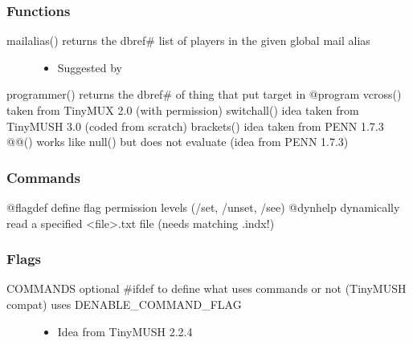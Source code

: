 \documentclass[letterpaper,10pt,english]{sphinxmanual}
\begin{document}
\subsubsection{Functions}
\label{\detokenize{changelog:id61}}\begin{description}
\item[{mailalias() \sphinxhyphen{} returns the dbref\# list of players in the given global mail alias}] \leavevmode\begin{itemize}
\item {} 
\sphinxAtStartPar
Suggested by 

\end{itemize}

\end{description}

\sphinxAtStartPar
programmer() \sphinxhyphen{} returns the dbref\# of thing that put target in @program
vcross() \sphinxhyphen{} taken from TinyMUX 2.0 (with permission)
switchall() \sphinxhyphen{} idea taken from TinyMUSH 3.0 (coded from scratch)
brackets() \sphinxhyphen{} idea taken from PENN 1.7.3
@@() \sphinxhyphen{} works like null() but does not evaluate (idea from PENN 1.7.3)


\subsubsection{Commands}
\label{\detokenize{changelog:id62}}
\sphinxAtStartPar
@flagdef \sphinxhyphen{} define flag permission levels (/set, /unset, /see)
@dynhelp \sphinxhyphen{} dynamically read a specified \textless{}file\textgreater{}.txt file (needs matching .indx!)


\subsubsection{Flags}
\label{\detokenize{changelog:id63}}\begin{description}
\item[{COMMANDS \sphinxhyphen{} optional \#ifdef to define what uses commands or not (TinyMUSH compat) uses \sphinxhyphen{}DENABLE\_COMMAND\_FLAG}] \leavevmode\begin{itemize}
\item {} 
\sphinxAtStartPar
Idea from TinyMUSH 2.2.4

\end{itemize}

\end{description}
\end{document}
